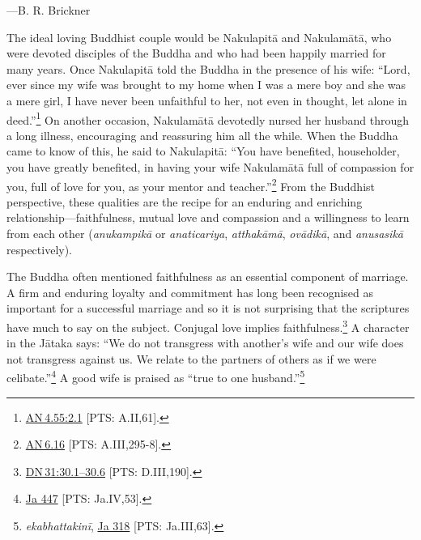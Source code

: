\documentclass[10pt, openright]{book}
\newenvironment{epigram-2-cite}%
{%
\quoting[leftmargin=2.5cm,rightmargin=2.5cm]%
\noindent\normal\hspace*{\fill} 
}%
{\endquoting\vspace{1em}
}%
\begin{document}
\begin{epigram-2-cite}
—B. R. Brickner
\end{epigram-2-cite}

The ideal loving Buddhist couple would be Nakulapitā and Nakulamātā, who were devoted disciples of the Buddha and who had been happily married for many years. Once Nakulapitā told the Buddha in the presence of his wife: “Lord, ever since my wife was brought to my home when I was a mere boy and she was a mere girl, I have never been unfaithful to her, not even in thought, let alone in deed.”\footnote {\href{https://suttacentral.net/an4.55/en/sujato\#2.1}{AN 4.55:2.1} [PTS: A.II,61].} On another occasion, Nakulamātā devotedly nursed her husband through a long illness, encouraging and reassuring him all the while. When the Buddha came to know of this, he said to Nakulapitā: “You have benefited, householder, you have greatly benefited, in having your wife Nakulamātā full of compassion for you, full of love for you, as your mentor and teacher.”\footnote {\href{https://suttacentral.net/an6.16/en/sujato}{AN 6.16} [PTS: A.III,295-8].} From the Buddhist perspective, these qualities are the recipe for an enduring and enriching relationship—faithfulness, mutual love and compassion and a willingness to learn from each other (\textit{anukampikā} or \textit{anaticariya}, \textit{atthakāmā}, \textit{ovādikā}, and \textit{anusasikā} respectively).


The Buddha often mentioned faithfulness as an essential component of marriage. A firm and enduring loyalty and commitment has long been recognised as important for a successful marriage and so it is not surprising that the scriptures have much to say on the subject. Conjugal love implies faithfulness.\footnote {\href{https://suttacentral.net/dn31/en/sujato\#30.1}{DN 31:30.1–30.6} [PTS: D.III,190].} A character in the Jātaka says: “We do not transgress with another’s wife and our wife does not transgress against us. We relate to the partners of others as if we were celibate.”\footnote {\href{https://suttacentral.net/ja447/en/rouse?reference=main/pts#pts-vp-pli53}{Ja 447} [PTS: Ja.IV,53].} A good wife is praised as “true to one husband.”\footnote {\textit{ekabhattakinī}, \href{https://suttacentral.net/ja318/en/francis-neil?reference=main/pts#pts-vp-pli63}{Ja 318} [PTS: Ja.III,63].}
\end{document}
